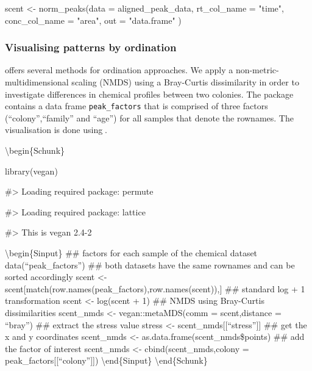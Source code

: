 \begin{Schunk}
\begin{Sinput}
scent <- norm_peaks(data = aligned_peak_data,
                   rt_col_name = "time",
                   conc_col_name = "area",
                   out = "data.frame" )
\end{Sinput}
\end{Schunk}

\subsubsection{Visualising patterns by
ordination}\label{visualising-patterns-by-ordination}

 offers several methods for ordination approaches. We apply a
non-metric-multidimensional scaling (NMDS) using a Bray-Curtis
dissimilarity in order to investigate differences in chemical profiles
between two colonies. The package contains a data frame
\texttt{peak\_factors} that is comprised of three factors
(``colony'',``family'' and ``age'') for all samples that denote the
rownames. The visualisation is done using.

\textbackslash{}begin\{Schunk\}

\begin{Sinput}
library(vegan)
\end{Sinput}\begin{Soutput}
#> Loading required package: permute
\end{Soutput}\begin{Soutput}
#> Loading required package: lattice
\end{Soutput}\begin{Soutput}
#> This is vegan 2.4-2
\end{Soutput}

\textbackslash{}begin\{Sinput\} \#\# factors for each sample of the
chemical dataset data(``peak\_factors'') \#\# both datasets have the
same rownames and can be sorted accordingly scent \textless{}-
scent{[}match(row.names(peak\_factors),row.names(scent)),{]} \#\#
standard log + 1 transformation scent \textless{}- log(scent + 1) \#\#
NMDS using Bray-Curtis dissimilarities scent\_nmds \textless{}-
vegan::metaMDS(comm = scent,distance = ``bray'') \#\# extract the stress
value stress \textless{}- scent\_nmds{[}{[}``stress''{]}{]} \#\# get the
x and y coordinates scent\_nmds \textless{}-
as.data.frame(scent\_nmds\$points) \#\# add the factor of interest
scent\_nmds \textless{}- cbind(scent\_nmds,colony =
peak\_factors{[}{[}``colony''{]}{]}) \textbackslash{}end\{Sinput\}
\textbackslash{}end\{Schunk\}

